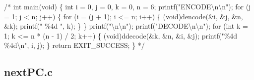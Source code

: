 \documentclass[
  12pt,
  letterpaper,
  DIV=11,
  numbers=noendperiod]{scrreprt}
\newenvironment{Shaded}{\begin{snugshade}}{\end{snugshade}}
\newcommand{\CommentTok}[1]{\textcolor[rgb]{0.37,0.37,0.37}{#1}}
\theoremstyle{remark}
\begin{document}
\begin{Shaded}
\begin{Highlighting}[]
\CommentTok{/*}
\CommentTok{int main(void) \{}
\CommentTok{    int i = 0, j = 0, k = 0, n = 6;}
\CommentTok{    printf("ENCODE\textbackslash{}n\textbackslash{}n");}
\CommentTok{    for (j = 1; j \textless{} n; j++) \{}
\CommentTok{        for (i = (j + 1); i \textless{}= n; i++) \{}
\CommentTok{            (void)dencode(\&i, \&j, \&n, \&k);}
\CommentTok{            printf(" \%4d ", k);}
\CommentTok{        \}}
\CommentTok{    \}}
\CommentTok{    printf("\textbackslash{}n\textbackslash{}n");}
\CommentTok{    printf("DECODE\textbackslash{}n\textbackslash{}n");}
\CommentTok{    for (int k = 1; k \textless{}= n * (n {-} 1) / 2; k++) \{}
\CommentTok{        (void)ddecode(\&k, \&n, \&i, \&j);}
\CommentTok{        printf("\%4d \%4d\textbackslash{}n", i, j);}
\CommentTok{    \}}
\CommentTok{    return EXIT\_SUCCESS;}
\CommentTok{\}}
\CommentTok{*/}
\end{Highlighting}
\end{Shaded}

\subsection*{nextPC.c}\label{nextpc.c}
\end{document}
